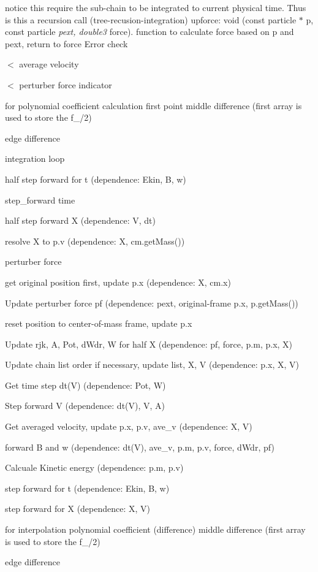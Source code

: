 notice this require the sub-\/chain to be integrated to current physical time. Thus is this a recursion call (tree-\/recusion-\/integration) upforce\+: void (const particle $\ast$ p, const particle {\itshape pext, double3} force). function to calculate force based on p and pext, return to force Error check

$<$ average velocity

$<$ perturber force indicator

for polynomial coefficient calculation first point middle difference (first array is used to store the f\+\_/2)

edge difference

integration loop

half step forward for t (dependence\+: Ekin, B, w)

step\+\_\+forward time

half step forward X (dependence\+: V, dt)

resolve X to p.\+v (dependence\+: X, cm.\+get\+Mass())

perturber force

get original position first, update p.\+x (dependence\+: X, cm.\+x)

Update perturber force pf (dependence\+: pext, original-\/frame p.\+x, p.\+get\+Mass())

reset position to center-\/of-\/mass frame, update p.\+x

Update rjk, A, Pot, d\+Wdr, W for half X (dependence\+: pf, force, p.\+m, p.\+x, X)

Update chain list order if necessary, update list, X, V (dependence\+: p.\+x, X, V)

Get time step dt(\+V) (dependence\+: Pot, W)

Step forward V (dependence\+: dt(\+V), V, A)

Get averaged velocity, update p.\+x, p.\+v, ave\+\_\+v (dependence\+: X, V)

forward B and w (dependence\+: dt(\+V), ave\+\_\+v, p.\+m, p.\+v, force, d\+Wdr, pf)

Calcuale Kinetic energy (dependence\+: p.\+m, p.\+v)

step forward for t (dependence\+: Ekin, B, w)

step forward for X (dependence\+: X, V)

for interpolation polynomial coefficient (difference) middle difference (first array is used to store the f\+\_/2)

edge difference

